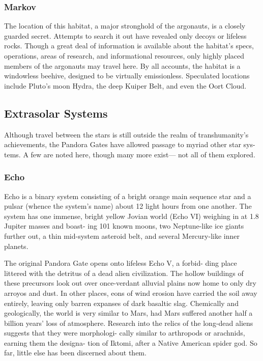 \subsubsection{Markov}

The location of this habitat, a major stronghold of 
the argonauts, is a closely guarded secret. Attempts to 
search it out have revealed only decoys or lifeless rocks. 
Though a great deal of information is available about 
the habitat's specs, operations, areas of research, and 
informational resources, only highly placed members 
of the argonauts may travel here. By all accounts, the 
habitat is a windowless beehive, designed to be virtually 
emissionless. Speculated locations include Pluto's moon 
Hydra, the deep Kuiper Belt, and even the Oort Cloud.

\subsection{Extrasolar Systems}

Although travel between the stars is still outside the 
realm of transhumanity's achievements, the Pandora 
Gates have allowed passage to myriad other star sys-
tems. A few are noted here, though many more exist—
not all of them explored.

\subsubsection{Echo}

Echo is a binary system consisting of a bright orange 
main sequence star and a pulsar (whence the system's 
name) about 12 light hours from one another. The 
system has one immense, bright yellow Jovian world 
(Echo VI) weighing in at 1.8 Jupiter masses and boast-
ing 101 known moons, two Neptune-like ice giants 
further out, a thin mid-system asteroid belt, and several 
Mercury-like inner planets.

The original Pandora Gate opens onto lifeless Echo V, a forbid-
ding place littered with the detritus of a dead alien civilization. The 
hollow buildings of these precursors look out over once-verdant 
alluvial plains now home to only dry arroyos and dust. In other 
places, eons of wind erosion have carried the soil away entirely, 
leaving only barren expanses of dark basaltic slag. Chemically and 
geologically, the world is very similar to Mars, had Mars suffered 
another half a billion years' loss of atmosphere. Research into the 
relics of the long-dead aliens suggests that they were morphologi-
cally similar to arthropods or arachnids, earning them the designa-
tion of Iktomi, after a Native American spider god. So far, little else 
has been discerned about them.

